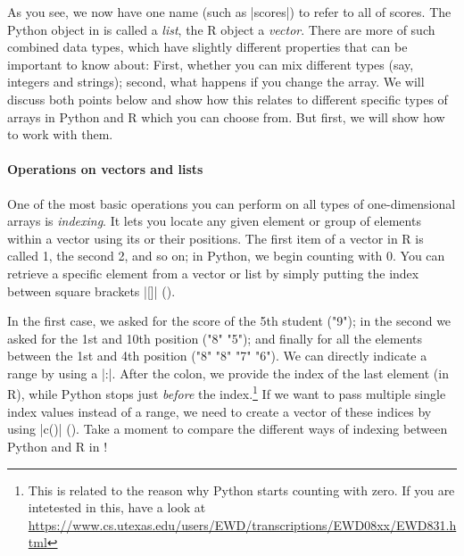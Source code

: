 
As you see, we now have one name (such as |scores|) to refer to all of scores.
The Python object in  is called a \emph{list}, the R object a \emph{vector}.
There are more of such combined data types, which have slightly different
properties that can be important to know about: First, whether you can mix different
types (say, integers and strings); second, what happens if you change the array.
We will discuss both points below and show how this relates to different
specific types of arrays in Python and R which you can choose from. But first,
we will show how to work with them.


\paragraph{Operations on vectors and lists}
One of the most
basic operations you can perform on all types of one-dimensional arrays
is \emph{indexing}. It lets you locate any given
element or group of elements within a vector using its or their
positions. The first item of a vector in R is called 1, the second 2, and so on;
in Python, we begin counting with 0.  You can retrieve a specific element
from a vector or list by simply putting the index between square brackets |[]| (). %


In the first case, we asked for the score of the 5th student ("9");
in the second we asked for the 1st and 10th position ("8" "5"); and
finally for all the elements between the 1st and 4th position ("8"
"8" "7" "6"). We can directly indicate a range
by using a |:|. After the colon, we provide the index of
the last element (in R), while Python stops just \emph{before} the index.\footnote{This is related to the
reason why Python starts counting with zero. If you are intetested
in this, have a look at \url{https://www.cs.utexas.edu/users/EWD/transcriptions/EWD08xx/EWD831.html}}
If we want to pass multiple single index values instead of a range,
we need to create a vector of these indices by using |c()| ().
Take a moment to compare the different ways of indexing between Python
and R in !

